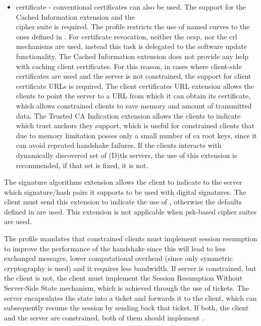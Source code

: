 \documentclass{llncs}
\begin{document}
\begin{itemize}
  \item certificate - conventional certificates can also be used. The support
  for the Cached Information extension\cite{RFC7924} and the\\ 
  cipher suite is required. The profile restricts the use of named curves to
  the ones defined in \cite{RFC4492}. For certificate revocation, neither the
  \gls{ocsp}\cite{RFC6960}, nor the \gls{crl}\cite{RFCabc} mechanisms are used, instead this task is delegated to
  the software update functionality. The Cached Information extension does not
  provide any help with caching client certificates. For this reason, in cases
  where client-side certificates are used and the server is not constrained,
  the support for client certificate URLs is required. The client certificates URL
  extension\cite{RFC4366} allows the clients to point the server to a URL from
  which it can obtain its certificate, which allows constrained clients to
  save memory and amount of transmitted data. The Trusted CA Indication\cite{RFC6066}
  extension allows the clients to indicate which trust anchors they support, which is useful
  for constrained clients that due to memory limitation posses only a small number
  of \gls{ca} root keys, since it can avoid repeated handshake failures. If the clients interacts with
  dynamically discovered set of (D)\gls{tls} servers, the use of this extension is recommended,
  if that set is fixed, it is not.

\end{itemize}

The signature algorithms extension\cite{RFC5246} allows the client to indicate
to the server which signature/hash pairs it supports to be used with digital signatures.
The client must send this extension to indicate the use of ,
otherwise the defaults defined in \cite{RFC5246} are used. This extension is not
applicable when \gls{psk}-based cipher suites are used.

The profile mandates that constrained clients must implement session
resumption to improve the performance of the handshake since this will lead to
less exchanged messages, lower computational overhead (since only symmetric cryptography
is used) and it requires less bandwidth. If server is constrained, but
the client is not, the client must implement the Session Resumption Without
Server-Side State mechanism\cite{RFC5077}, which is achieved through the
use of tickets. The server encapsulates the state into a ticket and forwards it to
the client, which can subsequently resume the session by sending back that ticket.
If both, the client and the server are constrained, both of them should implement
\cite{RFC5077}.
\end{document}
